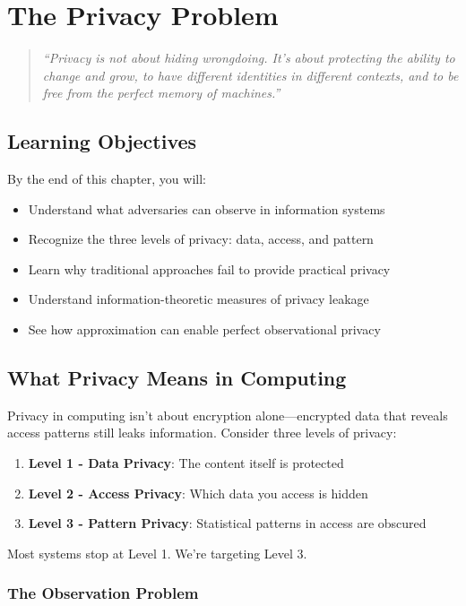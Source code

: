 \chapter{The Privacy Problem}
\label{ch:privacy-problem}

\begin{quote}
\textit{``Privacy is not about hiding wrongdoing. It's about protecting the ability to change and grow, to have different identities in different contexts, and to be free from the perfect memory of machines.''}
\end{quote}

\section*{Learning Objectives}
By the end of this chapter, you will:
\begin{itemize}
\item Understand what adversaries can observe in information systems
\item Recognize the three levels of privacy: data, access, and pattern
\item Learn why traditional approaches fail to provide practical privacy
\item Understand information-theoretic measures of privacy leakage
\item See how approximation can enable perfect observational privacy
\end{itemize}

\section{What Privacy Means in Computing}

Privacy in computing isn't about encryption alone—encrypted data that reveals access patterns still leaks information. Consider three levels of privacy:

\begin{enumerate}
\item \textbf{Level 1 - Data Privacy}: The content itself is protected
\item \textbf{Level 2 - Access Privacy}: Which data you access is hidden  
\item \textbf{Level 3 - Pattern Privacy}: Statistical patterns in access are obscured
\end{enumerate}

Most systems stop at Level 1. We're targeting Level 3.

\subsection{The Observation Problem}

